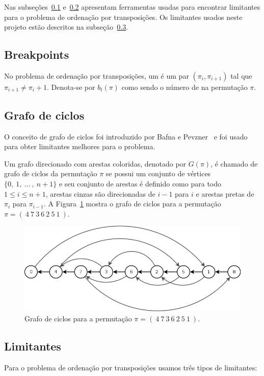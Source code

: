 Nas subseções~\ref{subsec:trans_bkp} e~\ref{subsec:trans_cycle_graph}
apresentam ferramentas usadas para encontrar limitantes para o
problema de ordenação por transposições. Os limitantes usados neste
projeto estão descritos na subseção~\ref{subsec:trans_limitantes}.

\subsection{Breakpoints}
\label{subsec:trans_bkp}
No problema de ordenação por transposições, um \bkp{} é um par
$(\pi_{i}, \pi_{i+1})$ tal que $\pi_{i+1} \neq \pi_{i} + 1$. Denota-se
por $b_{t}(\pi)$ como sendo o número de \bkp{} na permutação $\pi$.

\subsection{Grafo de ciclos}
\label{subsec:trans_cycle_graph}
O conceito de grafo de ciclos foi introduzido por Bafna e
Pevzner~\cite{BafnaPevzner*1998} e foi usado para obter limitantes
melhores para o problema.

Um grafo direcionado com arestas coloridas, denotado por $G(\pi)$, é
chamado de grafo de ciclos da permutação $\pi$ se possui um conjunto
de vértices $\{0,~1,~\ldots~,~n+1\}$ e seu conjunto de arestas é
definido como para todo $1 \leq i \leq n+1$, arestas cinzas são
direcionadas de $i-1$ para $i$ e arestas pretas de $\pi_{i}$ para
$\pi_{i-1}$. A Figura~\ref{fig:trans_cycle_graph} mostra o grafo de
ciclos para a permutação $\pi = (~4~7~3~6~2~5~1~)$.

\begin{figure}[h]
  \centering 
  \includegraphics[scale=0.6]{images/trans_cycle_graph.png} 
  \caption{Grafo de ciclos para a permutação $\pi = (~4~7~3~6~2~5~1~)$.}
  \label{fig:trans_cycle_graph}
\end{figure}

\subsection{Limitantes}
\label{subsec:trans_limitantes}
Para o problema de ordenação por transposições usamos três tipos de
limitantes:

